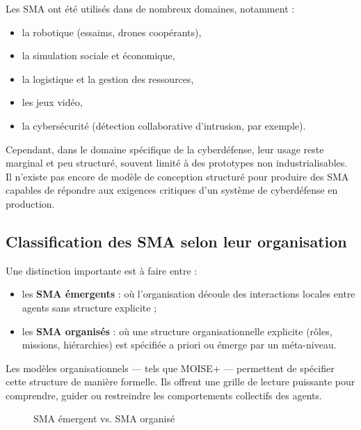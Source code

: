 \documentclass[ twoside,openright,titlepage,numbers=noenddot,headinclude,%
                footinclude=true,cleardoublepage=empty,abstractoff, %
                BCOR=5mm,paper=a4,fontsize=11pt,%
                french,american,%
                ]{scrreprt}
\begin{document}
Les SMA ont été utilisés dans de nombreux domaines, notamment :
\begin{itemize}
    \item la robotique (essaims, drones coopérants),
    \item la simulation sociale et économique,
    \item la logistique et la gestion des ressources,
    \item les jeux vidéo,
    \item la cybersécurité (détection collaborative d'intrusion, par exemple).
\end{itemize}

Cependant, dans le domaine spécifique de la cyberdéfense, leur usage reste marginal et peu structuré, souvent limité à des prototypes non industrialisables. Il n'existe pas encore de modèle de conception structuré pour produire des SMA capables de répondre aux exigences critiques d'un système de cyberdéfense en production.

\vspace{0.5em}
\subsection*{Classification des SMA selon leur organisation}

Une distinction importante est à faire entre :
\begin{itemize}
    \item les \textbf{SMA émergents} : où l'organisation découle des interactions locales entre agents sans structure explicite ;
    \item les \textbf{SMA organisés} : où une structure organisationnelle explicite (rôles, missions, hiérarchies) est spécifiée a priori ou émerge par un méta-niveau.
\end{itemize}

Les modèles organisationnels — tels que MOISE+ — permettent de spécifier cette structure de manière formelle. Ils offrent une grille de lecture puissante pour comprendre, guider ou restreindre les comportements collectifs des agents.

\begin{figure}[H]
    \centering
    \caption{SMA émergent vs. SMA organisé}
    \label{fig:sma-comparatif}
\end{figure}
\end{document}
